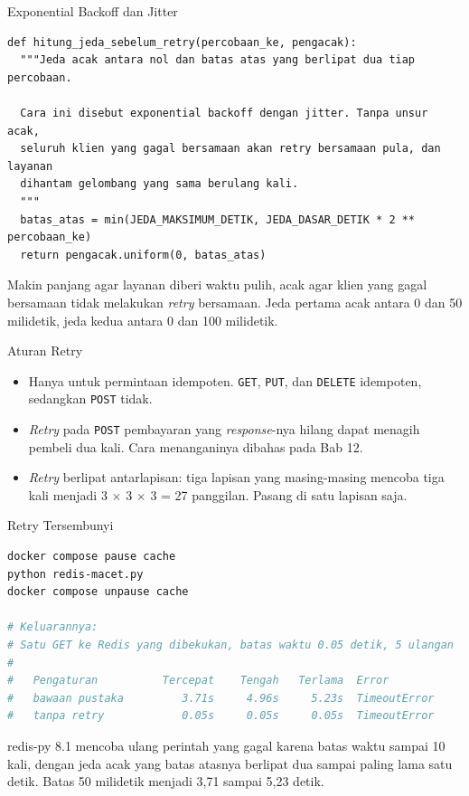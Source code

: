\documentclass[aspectratio=169, table, 12pt]{beamer}
\begin{document}
\begin{frame}[fragile]{{\Large Exponential Backoff dan Jitter}}
  \vspace{4pt}
\begin{lstlisting}[style=PythonStyle]
def hitung_jeda_sebelum_retry(percobaan_ke, pengacak):
  """Jeda acak antara nol dan batas atas yang berlipat dua tiap percobaan.

  Cara ini disebut exponential backoff dengan jitter. Tanpa unsur acak,
  seluruh klien yang gagal bersamaan akan retry bersamaan pula, dan layanan
  dihantam gelombang yang sama berulang kali.
  """
  batas_atas = min(JEDA_MAKSIMUM_DETIK, JEDA_DASAR_DETIK * 2 ** percobaan_ke)
  return pengacak.uniform(0, batas_atas)
\end{lstlisting}

  \vspace{4pt}
  {\footnotesize Makin panjang agar layanan diberi waktu pulih, acak agar
  klien yang gagal bersamaan tidak melakukan \textit{retry} bersamaan. Jeda
  pertama acak antara 0 dan 50 milidetik, jeda kedua antara 0 dan 100
  milidetik.}
\end{frame}

\begin{frame}{{\Large Aturan Retry}}
  \vspace{10pt}
  \begin{itemize}
    \item Hanya untuk permintaan idempoten. \texttt{GET}, \texttt{PUT}, dan
          \texttt{DELETE} idempoten, sedangkan \texttt{POST} tidak.
    \item \textit{Retry} pada \texttt{POST} pembayaran yang \textit{response}-nya hilang dapat
          menagih pembeli dua kali. Cara menanganinya dibahas pada Bab 12.
    \item \textit{Retry} berlipat antarlapisan: tiga lapisan yang masing-masing
          mencoba tiga kali menjadi 3 $\times$ 3 $\times$ 3 = 27 panggilan.
          Pasang di satu lapisan saja.
  \end{itemize}
\end{frame}

\begin{frame}[fragile]{{\Large Retry Tersembunyi}}
  \vspace{2pt}
\begin{lstlisting}[language=bash]
docker compose pause cache
python redis-macet.py
docker compose unpause cache

# Keluarannya:
# Satu GET ke Redis yang dibekukan, batas waktu 0.05 detik, 5 ulangan
#
#   Pengaturan          Tercepat    Tengah   Terlama  Error
#   bawaan pustaka         3.71s     4.96s     5.23s  TimeoutError
#   tanpa retry            0.05s     0.05s     0.05s  TimeoutError
\end{lstlisting}

  \vspace{2pt}
  {\footnotesize redis-py 8.1 mencoba ulang perintah yang gagal karena batas
  waktu sampai 10 kali, dengan jeda acak yang batas atasnya berlipat dua sampai
  paling lama satu detik. Batas 50 milidetik menjadi 3,71 sampai 5,23 detik.}
\end{frame}
\end{document}
